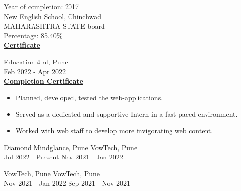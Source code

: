 \documentclass[letterpaper,10pt]{memoir} %
\begin{document}

{Year of completion: 2017}\\
{New English School, Chinchwad}\\
{MAHARASHTRA STATE board}\\
Percentage: 85.40\% \\
\textbf{\href{https://drive.google.com/file/d/1wmlNrcPq37uDmdl4n70nkkitifS35O1p/view?usp=sharing}{Certificate}}\\



{Education 4 ol, Pune}\\
{Feb 2022 - Apr 2022}\\
\textbf{\href{https://drive.google.com/file/d/1q4znCxAsUhgCQ-Uyw9eoTgJrF0NGa8YW/view?usp=sharing}{Completion Certificate}}
\begin{itemize}
	\item Planned, developed, tested the web-applications.

	\item Served as a dedicated and supportive Intern in a fast-paced environment.

	\item Worked with web staff to develop more invigorating web content.\\
\end{itemize}




{Diamond Mindglance, Pune \hspace{3.2cm} VowTech, Pune}\\
{Jul 2022 - Present \hspace{4.7cm} Nov 2021 - Jan 2022}\\


{VowTech, Pune \hspace{5.15cm} VowTech, Pune}\\
{Nov 2021 - Jan 2022 \hspace{4.3cm} Sep 2021 - Nov 2021}\\
\end{document}

